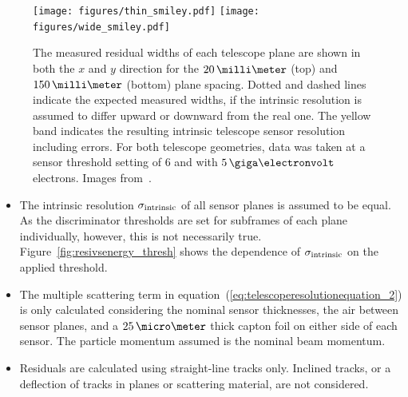 \begin{figure}[tbp]
  \centering
  \texttt{[image: figures/thin\_smiley.pdf]}
  \texttt{[image: figures/wide\_smiley.pdf]}
  \caption[The measured residual widths of each telescope plane.]{The measured residual widths of each telescope plane are shown in both the $x$ and $y$ direction for the $20\,\milli\meter$ (top)
   and $150\,\milli\meter$ (bottom) plane spacing.
  Dotted and dashed lines indicate the expected measured widths, if the intrinsic resolution is assumed to differ upward or downward from the real one. 
  The yellow band indicates the resulting intrinsic telescope sensor resolution including errors.
  For both telescope geometries, data was taken at a sensor threshold setting of $6$ and with $5\,\giga\electronvolt$ electrons.
  Images from~\cite{ref:thomas}.}
  \label{fig:smiley}
\end{figure}



\begin{itemize}
\item The intrinsic resolution $\sigma_{\textrm{intrinsic}}$ of all sensor planes is assumed to be equal.
As the discriminator thresholds are set for subframes of each plane individually, however, this is not necessarily true.
Figure~\ref{fig:resivsenergy_thresh} shows the dependence of $\sigma_{\textrm{intrinsic}}$ on the applied threshold.

\item The multiple scattering term in equation~(\ref{eq:telescoperesolutionequation_2}) is only calculated considering the nominal sensor thicknesses, the air between sensor planes,
 and a $25\,\micro\meter$ thick capton foil on either side of each sensor.
The particle momentum assumed is the nominal beam momentum.

\item Residuals are calculated using straight-line tracks only.
Inclined tracks, or a deflection of tracks in planes or scattering material, are not considered.
\end{itemize}

